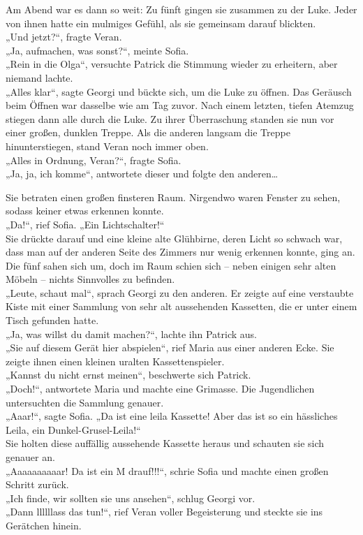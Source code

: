 \documentclass[oneside]{memoir}
\begin{document}
\noindent Am Abend war es dann so weit: Zu fünft gingen sie zusammen zu der Luke. Jeder von ihnen hatte ein mulmiges Gefühl, als sie gemeinsam darauf blickten.  \\
„Und jetzt?“, fragte Veran.  \\
„Ja, aufmachen, was sonst?“, meinte Sofia.  \\
„Rein in die Olga“, versuchte Patrick die Stimmung wieder zu erheitern, aber niemand lachte.  \\
„Alles klar“, sagte Georgi und bückte sich, um die Luke zu öffnen. Das Geräusch beim Öffnen war dasselbe wie am Tag zuvor. Nach einem letzten, tiefen Atemzug stiegen dann alle durch die Luke. Zu ihrer Überraschung standen sie nun vor einer großen, dunklen Treppe. Als die anderen langsam die Treppe hinunterstiegen, stand Veran noch immer oben.  \\
„Alles in Ordnung, Veran?“, fragte Sofia. \\
„Ja, ja, ich komme“, antwortete dieser und folgte den anderen\ldots

\bigskip
\noindent Sie betraten einen großen finsteren Raum. Nirgendwo waren Fenster zu sehen, sodass keiner etwas erkennen konnte. \\
„Da!“, rief Sofia. „Ein Lichtschalter!“ \\
Sie drückte darauf und eine kleine alte Glühbirne, deren Licht so schwach war, dass man auf der anderen Seite des Zimmers nur wenig erkennen konnte, ging an.
Die fünf sahen sich um, doch im Raum schien sich -- neben einigen sehr alten Möbeln -- nichts Sinnvolles zu befinden. \\
„Leute, schaut mal“, sprach Georgi zu den anderen. Er zeigte auf eine verstaubte Kiste mit einer Sammlung von sehr alt aussehenden Kassetten, die er unter einem Tisch gefunden hatte. \\
„Ja, was willst du damit machen?“, lachte ihn Patrick aus. \\
„Sie auf diesem Gerät hier abspielen“, rief Maria aus einer anderen Ecke. Sie zeigte ihnen einen kleinen uralten Kassettenspieler. \\
„Kannst du nicht ernst meinen“, beschwerte sich Patrick. \\
„Doch!“, antwortete Maria und machte eine Grimasse.
Die Jugendlichen untersuchten die Sammlung genauer. \\
„Aaar!“, sagte Sofia. „Da ist eine leila Kassette! Aber das ist so ein hässliches Leila, ein Dunkel-Grusel-Leila!“ \\
Sie holten diese auffällig aussehende Kassette heraus und schauten sie sich genauer an. \\
„Aaaaaaaaaar! Da ist ein M drauf!!!“, schrie Sofia und machte einen großen Schritt zurück. \\
„Ich finde, wir sollten sie uns ansehen“, schlug Georgi vor. \\
„Dann llllllass das tun!“, rief Veran voller Begeisterung und steckte sie ins Gerätchen hinein.
     
\end{document}
